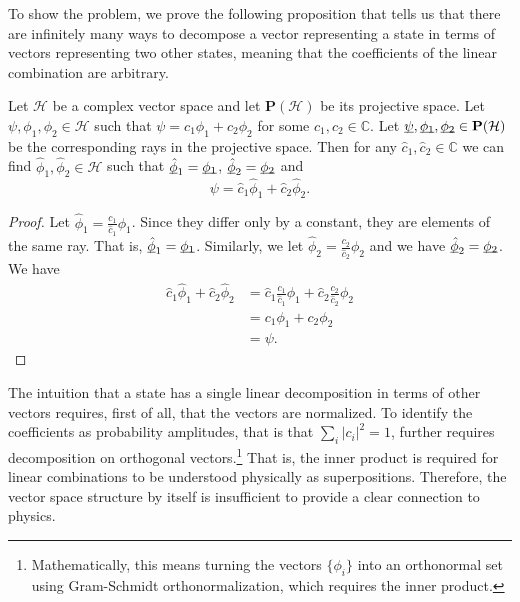 \documentclass[10pt,twocolumn, nofootinbib]{revtex4-2}
\begin{document}
To show the problem, we prove the following proposition that tells us that there are infinitely many ways to decompose a vector representing a state in terms of vectors representing two other states, meaning that the coefficients of the linear combination are arbitrary.
\begin{prop}\label{vector_insufficient} Let $\mathcal{H}$ be a complex vector space and let $\textbf{P}(\mathcal{H})$ be its projective space. Let $\psi, \phi_1, \phi_2 \in \mathcal{H}$ such that $\psi = c_1 \phi_1 + c_2 \phi_2$ for some $c_1, c_2 \in \mathbb{C}$. Let $\underbar{$\psi$}, \underbar{$\phi_1$}, \underbar{$\phi_2$} \in \textbf{P}(\mathcal{H})$ be the corresponding rays in the projective space. Then for any $\hat{c}_1, \hat{c}_2 \in \mathbb{C}$ we can find  $\hat{\phi}_1, \hat{\phi}_2 \in \mathcal{H}$ such that $\underbar{$\hat{\phi}$}_1 = \underbar{$\phi_1$}$, $\underbar{$\hat{\phi}$}_2 = \underbar{$\phi_2$}$ and
$$\psi = \hat{c}_1 \hat{\phi}_1 + \hat{c}_2 \hat{\phi}_2.$$
\end{prop}

\begin{proof}
Let $\hat{\phi}_1 = \frac{c_1}{\hat{c}_1} \phi_1$. Since they differ only by a constant, they are elements of the same ray. That is, $\underbar{$\hat{\phi}$}_1 = \underbar{$\phi_1$}$. Similarly, we let $\hat{\phi}_2 = \frac{c_2}{\hat{c}_2} \phi_2$ and we have $\underbar{$\hat{\phi}$}_2 = \underbar{$\phi_2$}$. We have
\begin{equation}
\begin{aligned}
\hat{c}_1 \hat{\phi}_1 + \hat{c}_2 \hat{\phi}_2 &= \hat{c}_1 \frac{c_1}{\hat{c}_1} \phi_1 + \hat{c}_2 \frac{c_2}{\hat{c}_2} \phi_2 \\
&= c_1 \phi_1 + c_2 \phi_2 \\
&= \psi.
\end{aligned}
\end{equation}
\end{proof}

The intuition that a state has a single linear decomposition in terms of other vectors requires, first of all, that the vectors are normalized. To identify the coefficients as probability amplitudes, that is that $\sum_i |c_i|^2 = 1$, further requires decomposition on orthogonal vectors.\footnote{Mathematically, this means turning the vectors $\{\phi_i\}$ into an orthonormal set using Gram-Schmidt orthonormalization, which requires the inner product.} That is, the inner product is required for linear combinations to be understood physically as superpositions. Therefore, the vector space structure by itself is insufficient to provide a clear connection to physics.
\end{document}
